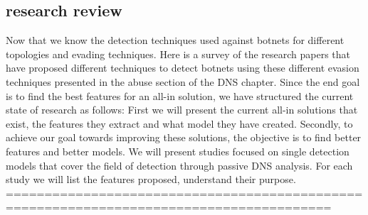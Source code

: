 \subsection{research review}
Now that we know the detection techniques used against botnets for different topologies and evading techniques. Here is a survey of the research papers that have proposed different techniques to detect botnets using these different evasion techniques presented in the abuse section of the DNS chapter.
Since the end goal is to find the best features for an all-in solution, we have structured the current state of research as follows: 
First we will present the current all-in solutions that exist, the features they extract and what model they have created. 
Secondly, to achieve our goal towards improving these solutions, the objective is to find better features and better models. We will present studies focused on single detection models that cover the field of detection through passive DNS analysis. For each study we will list the features proposed, understand their purpose.\\

========================================================================================






